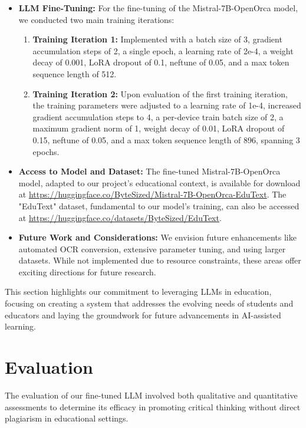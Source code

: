 \documentclass[]{article}
\begin{document}
\begin{itemize}
    \item \textbf{LLM Fine-Tuning:} For the fine-tuning of the Mistral-7B-OpenOrca model, we conducted two main training iterations:
        \begin{enumerate}
            \item \textbf{Training Iteration 1:} Implemented with a batch size of 3, gradient accumulation steps of 2, a single epoch, a learning rate of 2e-4, a weight decay of 0.001, LoRA dropout of 0.1, neftune of 0.05, and a max token sequence length of 512.
            \item \textbf{Training Iteration 2:} Upon evaluation of the first training iteration, the training parameters were adjusted to a learning rate of 1e-4, increased gradient accumulation steps to 4, a per-device train batch size of 2, a maximum gradient norm of 1, weight decay of 0.01, LoRA dropout of 0.15, neftune of 0.05, and a max token sequence length of 896, spanning 3 epochs.
        \end{enumerate}

    \item \textbf{Access to Model and Dataset:} The fine-tuned Mistral-7B-OpenOrca model, adapted to our project's educational context, is available for download at \url{https://huggingface.co/ByteSized/Mistral-7B-OpenOrca-EduText}. The "EduText" dataset, fundamental to our model's training, can also be accessed at \url{https://huggingface.co/datasets/ByteSized/EduText}.

    \item \textbf{Future Work and Considerations:} We envision future enhancements like automated OCR conversion, extensive parameter tuning, and using larger datasets. While not implemented due to resource constraints, these areas offer exciting directions for future research.
\end{itemize}

This section highlights our commitment to leveraging LLMs in education, focusing on creating a system that addresses the evolving needs of students and educators and laying the groundwork for future advancements in AI-assisted learning.

\section{Evaluation}

The evaluation of our fine-tuned LLM involved both qualitative and quantitative assessments to determine its efficacy in promoting critical thinking without direct plagiarism in educational settings.
\end{document}
